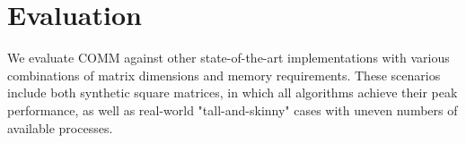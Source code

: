 \documentclass[sigplan,review,anonymous,10pt]{acmart}\settopmatter{printfolios=true,printccs=false,printacmref=false}
\newcommand\greg[1]{\textcolor{blue}{[Greg: #1]}}
\newcommand\mac[1]{\textcolor{red}{[Mac: #1]}}
\begin{document}
%

\section{Evaluation}
\label{sec:evaluation}

We evaluate COMM against other state-of-the-art implementations with various 
combinations of matrix dimensions and memory requirements. These scenarios 
include both synthetic square matrices, in which all algorithms achieve their 
peak performance, as well as real-world "tall-and-skinny" cases with uneven 
numbers of available processes. 
 
\end{document}
